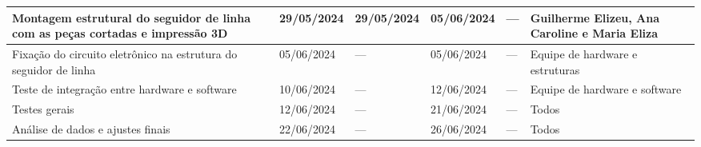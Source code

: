 \begin{xltabular}{\columnwidth}{X|X|X|X|X|X}
  Montagem estrutural do seguidor de linha com as peças cortadas e impressão 3D & 29/05/2024 & 29/05/2024 & 05/06/2024 & --- & Guilherme Elizeu, Ana Caroline e Maria Eliza \\
  \hline

  Fixação do circuito eletrônico na estrutura do seguidor de linha & 05/06/2024 & --- & 05/06/2024 & --- & Equipe de hardware e estruturas \\
  \hline

  Teste de integração entre hardware e software & 10/06/2024 & --- & 12/06/2024 & --- & Equipe de hardware e software \\
  \hline

  Testes gerais & 12/06/2024 & --- & 21/06/2024 & --- & Todos \\
  \hline

  Análise de dados e ajustes finais & 22/06/2024 & --- & 26/06/2024 & --- & Todos \\
  \hline
\end{xltabular}
